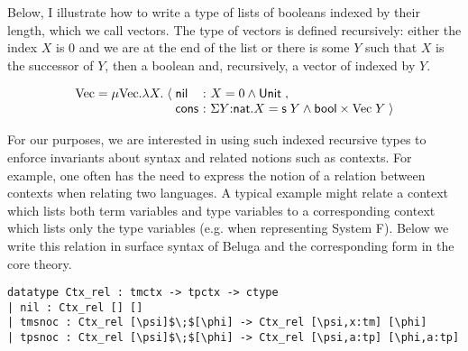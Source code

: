 \documentclass{article}
\begin{document}
Below, I illustrate how to write a type of lists of booleans indexed by their
length, which we call vectors. The type of vectors is defined
recursively: either the index $X$ is 0 and we are at the end of the
list or there is some $Y$ such that $X$ is the successor of $Y$, then
a boolean and, recursively, a vector of indexed by $Y$.

\[
\begin{array}{r@{\;}c@{\;}l@{~:~}l}
%
\text{Vec} = \mu \text{Vec}. \lambda X. & \langle & \m{nil} &  X = 0 \andalso \tunit\;, \\
&  & \m{cons} &  \sigmabox Y \nat X = \m{s}\;Y \andalso \m{bool} \times \text{Vec}\;Y  \;\rangle 
\end{array}
\]

For our purposes, we are interested in using such indexed recursive
types to enforce invariants about syntax and related notions such as contexts.
For example, one often has the need to express the notion of a relation
between contexts when relating two languages. A typical example might relate a context
which lists both term variables and type variables to a corresponding
context which lists only the type variables (e.g. when representing
System F). Below we write this relation in surface syntax of Beluga and the
corresponding form in the core theory. 


\begin{lstlisting}
datatype Ctx_rel : tmctx -> tpctx -> ctype
| nil : Ctx_rel [] []
| tmsnoc : Ctx_rel [\psi]$\;$[\phi] -> Ctx_rel [\psi,x:tm] [\phi]
| tpsnoc : Ctx_rel [\psi]$\;$[\phi] -> Ctx_rel [\psi,a:tp] [\phi,a:tp]
\end{lstlisting}

\end{document}
